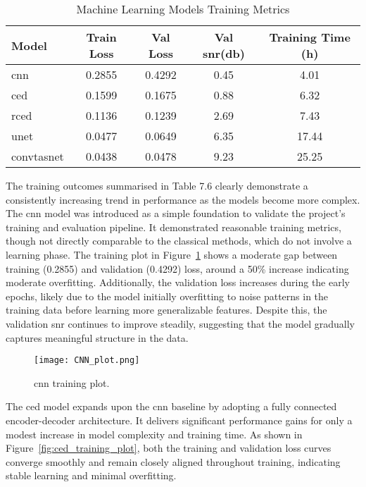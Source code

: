 \vspace{1em}
\begin{table}[H]
\centering
\caption{Machine Learning Models Training Metrics}
\label{tab:ml_training}
\begin{tabular}{|l|c|c|c|c|}
\hline
\textbf{Model} & \textbf{Train Loss} & \textbf{Val Loss} & \textbf{Val \gls{snr}(db)} & \textbf{Training Time (h)} \\
\hline
\gls{cnn}         & 0.2855 & 0.4292 & 0.45 & 4.01 \\
\gls{ced}         & 0.1599 & 0.1675 & 0.88 & 6.32 \\
\gls{rced}        & 0.1136 & 0.1239 & 2.69 & 7.43 \\
\gls{unet}        & 0.0477 & 0.0649 & 6.35 & 17.44 \\
\gls{convtasnet}  & 0.0438 & 0.0478 & 9.23 & 25.25 \\
\hline
\end{tabular}
\end{table}

The training outcomes summarised in Table 7.6 clearly demonstrate a consistently increasing trend in performance as the models become more complex. The \gls{cnn} model was introduced as a simple foundation to validate the project’s training and evaluation pipeline. It demonstrated reasonable training metrics, though not directly comparable to the classical methods, which do not involve a learning phase. The training plot in Figure~\ref{fig:cnn_training_plot} shows a moderate gap between training (0.2855) and validation (0.4292) loss, around a 50\% increase indicating moderate overfitting. Additionally, the validation loss increases during the early epochs, likely due to the model initially overfitting to noise patterns in the training data before learning more generalizable features. Despite this, the validation \gls{snr} continues to improve steadily, suggesting that the model gradually captures meaningful structure in the data.

\begin{figure}[H]
    \centering
    \texttt{[image: CNN\_plot.png]}
    \caption{\label{fig:cnn_training_plot} \gls{cnn} training plot.}
\end{figure}

The \gls{ced} model expands upon the \gls{cnn} baseline by adopting a fully connected encoder-decoder architecture. It delivers significant performance gains for only a modest increase in model complexity and training time. As shown in Figure~\ref{fig:ced_training_plot}, both the training and validation loss curves converge smoothly and remain closely aligned throughout training, indicating stable learning and minimal overfitting.

